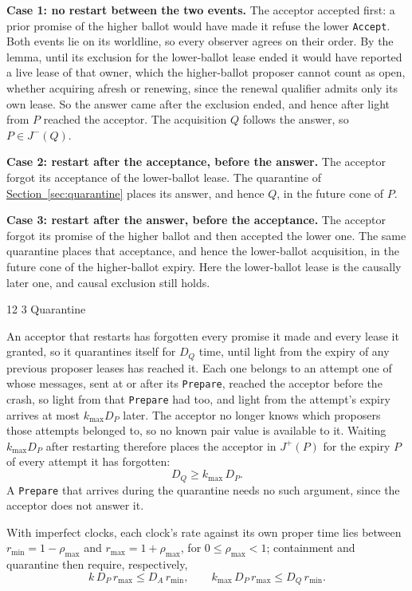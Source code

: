 \documentclass[final,5p,times,twocolumn,number]{elsarticle}
\makeatletter
\newcommand{\code}[1]{\texttt{#1}}
\newcommand{\secref}[1]{\hyperref[#1]{Section~\ref*{#1}}}
\renewcommand\subsection{\@startsection{subsection}{2}{\z@}%
           {12\p@ \@plus 6\p@ \@minus 3\p@}%
           {3\p@ \@plus 6\p@ \@minus 3\p@}%
           {\normalfont\normalsize\bfseries}}
\makeatother
\begin{document}
\textbf{Case 1: no restart between the two events.}  The acceptor accepted first: a prior promise of the higher ballot would have made it refuse the lower \code{Accept}.  Both events lie on its worldline, so every observer agrees on their order.  By the lemma, until its exclusion for the lower-ballot lease ended it would have reported a live lease of that owner, which the higher-ballot proposer cannot count as open, whether acquiring afresh or renewing, since the renewal qualifier admits only its own lease.  So the answer came after the exclusion ended, and hence after light from $P$ reached the acceptor.  The acquisition $Q$ follows the answer, so $P \in J^-(Q)$.

\textbf{Case 2: restart after the acceptance, before the answer.}  The acceptor forgot its acceptance of the lower-ballot lease.  The quarantine of \secref{sec:quarantine} places its answer, and hence $Q$, in the future cone of $P$.

\textbf{Case 3: restart after the answer, before the acceptance.}  The acceptor forgot its promise of the higher ballot and then accepted the lower one.  The same quarantine places that acceptance, and hence the lower-ballot acquisition, in the future cone of the higher-ballot expiry.  Here the lower-ballot lease is the causally later one, and causal exclusion still holds.

\subsection{Quarantine}\label{sec:quarantine}

An acceptor that restarts has forgotten every promise it made and every lease it granted, so it quarantines itself for $D_Q$ time, until light from the expiry of any previous proposer leases has reached it.  Each one belongs to an attempt one of whose messages, sent at or after its \code{Prepare}, reached the acceptor before the crash, so light from that \code{Prepare} had too, and light from the attempt's expiry arrives at most $k_{\max}D_P$ later.  The acceptor no longer knows which proposers those attempts belonged to, so no known pair value is available to it.  Waiting $k_{\max}D_P$ after restarting therefore places the acceptor in $J^+(P)$ for the expiry $P$ of every attempt it has forgotten:
\[
  D_Q \geq k_{\max}\,D_P .
\]
A \code{Prepare} that arrives during the quarantine needs no such argument, since the acceptor does not answer it.

With imperfect clocks, each clock's rate against its own proper time lies between $r_{\min} = 1-\rho_{\max}$ and $r_{\max} = 1+\rho_{\max}$, for $0 \leq \rho_{\max} < 1$; containment and quarantine then require, respectively,
\[
  k\,D_P\,r_{\max} \leq D_A\,r_{\min},
  \qquad
  k_{\max}\,D_P\,r_{\max} \leq D_Q\,r_{\min}.
\]
\end{document}
